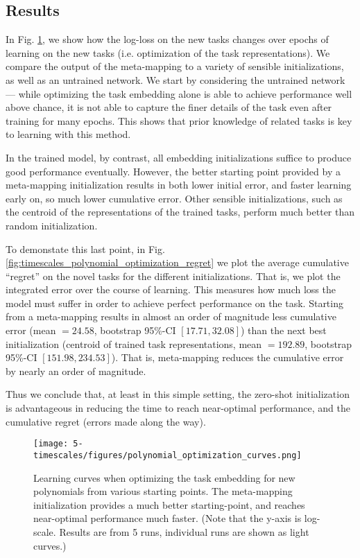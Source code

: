 \subsection{Results}
In Fig. \ref{fig:timescales_polynomial_optimization_curves}, we show how the log-loss on the new tasks changes over epochs of learning on the new tasks (i.e. optimization of the task representations). We compare the output of the meta-mapping to a variety of sensible initializations, as well as an untrained network. We start by considering the untrained network --- while optimizing the task embedding alone is able to achieve performance well above chance, it is not able to capture the finer details of the task even after training for many epochs. This shows that prior knowledge of related tasks is key to learning with this method. \par
In the trained model, by contrast, all embedding initializations suffice to produce good performance eventually. However, the better starting point provided by a meta-mapping initialization results in both lower initial error, and faster learning early on, so much lower cumulative error. Other sensible initializations, such as the centroid of the representations of the trained tasks, perform much better than random initialization.\par
To demonstate this last point, in Fig. \ref{fig:timescales_polynomial_optimization_regret} we plot the average cumulative ``regret'' on the novel tasks for the different initializations. That is, we plot the integrated error over the course of learning. This measures how much loss the model must suffer in order to achieve perfect performance on the task. Starting from a meta-mapping results in almost an order of magnitude less cumulative error (mean \(= 24.58\), bootstrap 95\%-CI \([17.71, 32.08]\)) than the next best initialization (centroid of trained task representations, mean \(= 192.89\), bootstrap 95\%-CI \([151.98, 234.53]\)). That is, meta-mapping reduces the cumulative error by nearly an order of magnitude. \par
Thus we conclude that, at least in this simple setting, the zero-shot initialization is advantageous in reducing the time to reach near-optimal performance, and the cumulative regret (errors made along the way). \par 
\begin{figure}[p]
\centering
\texttt{[image: 5-timescales/figures/polynomial\_optimization\_curves.png]}
\caption[Learning curves when optimizing the task embedding for new polynomials from various starting points.]{Learning curves when optimizing the task embedding for new polynomials from various starting points. The meta-mapping initialization provides a much better starting-point, and reaches near-optimal performance much faster. (Note that the y-axis is log-scale. Results are from 5 runs, individual runs are shown as light curves.)} \label{fig:timescales_polynomial_optimization_curves}
\end{figure}


